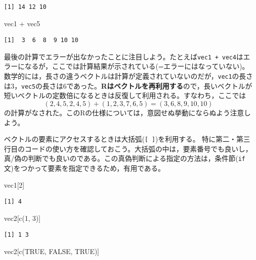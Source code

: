 \documentclass[
  a4paper,
]{ltjsbook}
\newenvironment{Shaded}{\begin{snugshade}}{\end{snugshade}}
\newcommand{\ConstantTok}[1]{\textcolor[rgb]{0.56,0.35,0.01}{#1}}
\newcommand{\DecValTok}[1]{\textcolor[rgb]{0.68,0.00,0.00}{#1}}
\newcommand{\FunctionTok}[1]{\textcolor[rgb]{0.28,0.35,0.67}{#1}}
\newcommand{\NormalTok}[1]{\textcolor[rgb]{0.00,0.23,0.31}{#1}}
\newcommand{\SpecialCharTok}[1]{\textcolor[rgb]{0.37,0.37,0.37}{#1}}
\begin{document}
\begin{verbatim}
[1] 14 12 10
\end{verbatim}

\begin{Shaded}
\begin{Highlighting}[]
\NormalTok{vec1 }\SpecialCharTok{+}\NormalTok{ vec5}
\end{Highlighting}
\end{Shaded}

\begin{verbatim}
[1]  3  6  8  9 10 10
\end{verbatim}

最後の計算でエラーが出なかったことに注目しよう。たとえば\texttt{vec1\ +\ vec4}はエラーになるが，ここでは計算結果が示されている(=エラーにはなっていない)。数学的には，長さの違うベクトルは計算が定義されていないのだが，\texttt{vec1}の長さは3，\texttt{vec5}の長さは6であった。\textbf{Rはベクトルを再利用する}ので，長いベクトルが短いベクトルの定数倍になるときは反復して利用される。すなわち，ここでは
\[ (2,4,5,2,4,5) + (1,2,3,7,6,5) = (3,6,8,9,10,10)\]
の計算がなされた。このRの仕様については，意図せぬ挙動にならぬよう注意しよう。

ベクトルの要素にアクセスするときは大括弧(\texttt{{[}\ {]}})を利用する。
特に第二・第三行目のコードの使い方を確認しておこう。大括弧の中は，要素番号でも良いし，真/偽の判断でも良いのである。この真偽判断による指定の方法は，条件節(\texttt{if}文)をつかって要素を指定できるため，有用である。

\begin{Shaded}
\begin{Highlighting}[]
\NormalTok{vec1[}\DecValTok{2}\NormalTok{]}
\end{Highlighting}
\end{Shaded}

\begin{verbatim}
[1] 4
\end{verbatim}

\begin{Shaded}
\begin{Highlighting}[]
\NormalTok{vec2[}\FunctionTok{c}\NormalTok{(}\DecValTok{1}\NormalTok{, }\DecValTok{3}\NormalTok{)]}
\end{Highlighting}
\end{Shaded}

\begin{verbatim}
[1] 1 3
\end{verbatim}

\begin{Shaded}
\begin{Highlighting}[]
\NormalTok{vec2[}\FunctionTok{c}\NormalTok{(}\ConstantTok{TRUE}\NormalTok{, }\ConstantTok{FALSE}\NormalTok{, }\ConstantTok{TRUE}\NormalTok{)]}
\end{Highlighting}
\end{Shaded}
\end{document}
